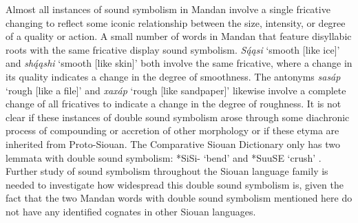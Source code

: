 Almost all instances of sound symbolism in Mandan involve a single fricative changing to reflect some iconic relationship between the size, intensity, or degree of a quality or action. A small number of words in Mandan that feature disyllabic roots with the same fricative display sound symbolism. \textit{Są́ąsi} `smooth [like ice]' and  \textit{shą́ąshi} `smooth [like skin]' both involve the same fricative, where a change in its quality indicates a change in the degree of smoothness. The antonyms \textit{sasáp} `rough [like a file]'  and \textit{xaxáp}  `rough [like sandpaper]' likewise involve a complete change of all fricatives to indicate a change in the degree of roughness. It is not clear if these instances of double sound symbolism arose through some diachronic process of compounding or accretion of other morphology or if these etyma are inherited from Proto-Siouan. The Comparative Siouan Dictionary only has two lemmata	 with double sound symbolism: *SiSi- `bend' and *SuuSE `crush' \citep{rankin2015}. Further study of sound symbolism throughout the Siouan language family is needed to investigate how widespread this double sound symbolism is, given the fact that the two Mandan words with double sound symbolism mentioned here do not have any identified cognates in other Siouan languages.
